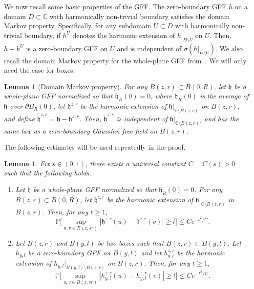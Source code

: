 \documentclass[a4paper]{article}
\numberwithin{equation}{section}
\newtheorem{lemma}[theorem]{Lemma}
\numberwithin{equation}{section}
\renewcommand{\1}{\mathbf{1}}
\begin{document}
We now recall some basic properties of the GFF. The zero-boundary GFF $h$ on a domain $D \subset \mathbb{C}$ with harmonically non-trivial boundary satisfies the domain Markov property. Specifically, for any subdomain $U \subset D$ with harmonically non-trivial boundary, if $h^U$ denotes the harmonic extension of $h|_{D \setminus U}$ on $U$. Then, $h - h^U$ is a zero-boundary GFF on $U$ and is independent of $\sigma(h|_{D \setminus U})$. We also recall the domain Markov property for the whole-plane GFF from~\cite[Lemma 2.2]{GMS-harmonic}. We will only need the case for boxes.

\begin{lemma}[Domain Markov property]\label{lem:whole-plane-markov}
    For any $B(z,r) \subset B(0,R)$, let $\mathfrak h$ be a whole-plane GFF normalized so that $\mathfrak h_R(0) = 0$, where $\mathfrak h_R(0)$ is the average of $\mathfrak h$ over $\partial B_R(0)$. let $\mathfrak h^{z,r}$ be the harmonic extension of $\mathfrak h|_{\mathbb{C} \setminus B(z,r)}$ on $B(z,r)$, and define $\mathring{\mathfrak h}^{z,r} = \mathfrak h - \mathfrak h^{z,r}$. Then, $\mathring{\mathfrak h}^{z,r}$ is independent of $\mathfrak h|_{\mathbb{C} \setminus B(z,r)}$, and has the same law as a zero-boundary Gaussian free field on $B(z,r)$.
\end{lemma}

The following estimates will be used repeatedly in the proof.

\begin{lemma}\label{lem:gff-estimate-5.11}
    Fix $s \in (0,1)$, there exists a universal constant $C = C(s)>0$ such that the following holds.
    \begin{enumerate}
        \item Let $\mathfrak h$ be a whole-plane GFF normalized so that $\mathfrak h_R(0) = 0$. For any $B(z,r) \subset B(0,R)$, let $\mathfrak h^{z,r}$ be the harmonic extension of $\mathfrak h|_{\mathbb{C} \setminus B(z,r)}$ in $B(z,r)$. Then, for any $t \geq 1$,
        $$
        \mathbb{P} \Big[ \sup_{u,v \in B(z, sr)} |\mathfrak h^{z, r}(u) - \mathfrak h^{z,r}(v)| \geq t \Big] \leq C e^{-t^2 / C}.
        $$ \label{lem5.9-claim-1}
        \item Let $B(z,r)$ and $B(y,l)$ be two boxes such that $B(z,r) \subset B(y,l)$. Let $h_{y,l}$ be a zero-boundary GFF on $B(y,l)$ and let $h^{z,r}_{y,l}$ be the harmonic extension of $h_{y,l}|_{B(y,l) \setminus B(z,r)}$ on $B(z,r)$. Then, for any $t \geq 1$,
        $$
        \mathbb{P} \Big[ \sup_{u,v \in B(z, sr)} |h^{z, r}_{y,l}(u) - h^{z,r}_{y,l}(v)| \geq t \Big] \leq C e^{-t^2 / C}.
        $$ \label{lem5.9-claim-2}
    \end{enumerate}
\end{lemma}
\end{document}
